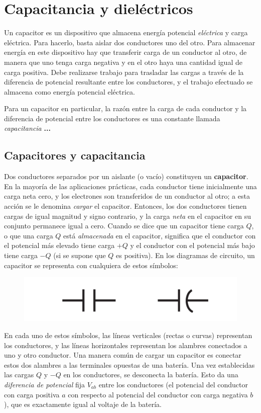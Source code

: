 \chapter{Capacitancia y dieléctricos}
Un capacitor es un dispositivo que almacena energía potencial \textit{eléctrica} y carga eléctrica. Para hacerlo, basta aislar dos conductores uno del otro. Para almacenar energía en este dispositivo hay que transferir carga de un conductor al otro, de manera que uno tenga carga negativa y en el otro haya una cantidad igual de carga positiva. Debe realizarse trabajo para trasladar las cargas a través de la diferencia de potencial resultante entre los conductores, y el trabajo efectuado se almacena como energía potencial eléctrica.

Para un capacitor en particular, la razón entre la carga de cada conductor y la diferencia de potencial entre los conductores es una constante llamada \textit{capacitancia} \textbf{...}

\section{Capacitores y capacitancia}
Dos conductores separados por un aislante (o vacío) constituyen un \textbf{capacitor}. En la mayoría de las aplicaciones prácticas, cada conductor tiene inicialmente una carga neta cero, y los electrones son transferidos de un conductor al otro; a esta acción se le denomina \textit{cargar} el capacitor. Entonces, los dos conductores tienen cargas de igual magnitud y signo contrario, y la carga \textit{neta} en el capacitor en su conjunto permanece igual a cero. Cuando se dice que un capacitor tiene carga $Q$, o que una carga $Q$ está \textit{almacenada} en el capacitor, significa que el conductor con el potencial más elevado tiene carga $+Q$ y el conductor con el potencial más bajo tiene carga $-Q$ (si se supone que $Q$ es positiva). En los diagramas de circuito, un capacitor se representa con cualquiera de estos símbolos:

\begin{figure}[h]
\centering
\includegraphics[scale=0.4]{fig/capacitor}
\end{figure}

En cada uno de estos símbolos, las líneas verticales (rectas o curvas) representan los conductores, y las líneas horizontales representan los alambres conectados a uno y otro conductor. Una manera común de cargar un capacitor es conectar estos dos alambres a las terminales opuestas de una batería. Una vez establecidas las cargas $Q$ y $-Q$ en los conductores, se desconecta la batería. Esto da una \textit{diferencia de potencial} fija $V_{ab}$ entre los conductores (el potencial del conductor con carga positiva $a$ con respecto al potencial del conductor con carga negativa $b$), que es exactamente igual al voltaje de la batería.

